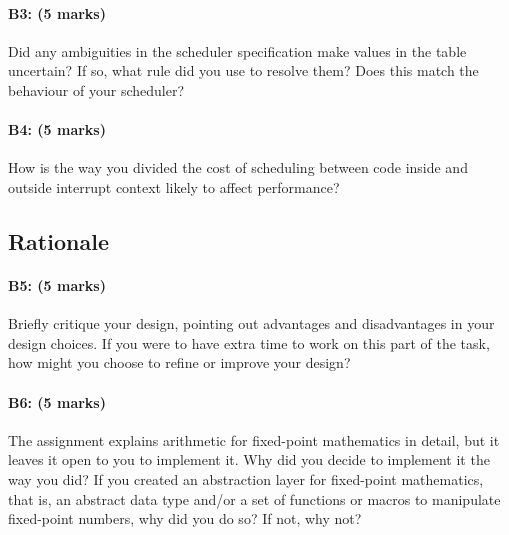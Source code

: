\paragraph{B3: (5 marks)}
Did any ambiguities in the scheduler specification make values in the table
uncertain?  If so, what rule did you use to resolve them?  Does this match the
behaviour of your scheduler?

\paragraph{B4: (5 marks)}
How is the way you divided the cost of scheduling between code inside and
outside interrupt context likely to affect performance?

\subsection{Rationale}
\paragraph{B5: (5 marks)}
Briefly critique your design, pointing out advantages and disadvantages in your
design choices.  If you were to have extra time to work on this part of the
task, how might you choose to refine or improve your design?

\paragraph{B6: (5 marks)}
The assignment explains arithmetic for fixed-point mathematics in detail, but it
leaves it open to you to implement it.  Why did you decide to implement it the
way you did?  If you created an abstraction layer for fixed-point mathematics,
that is, an abstract data type and/or a set of functions or macros to manipulate
fixed-point numbers, why did you do so?  If not, why not?
